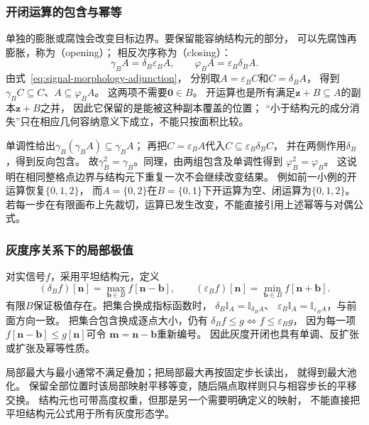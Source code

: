 \subsubsection{开闭运算的包含与幂等}
单独的膨胀或腐蚀会改变目标边界。要保留能容纳结构元的部分，
可以先腐蚀再膨胀，称为（opening）；
相反次序称为（closing）：
\begin{equation}
 \gamma_B A=\delta_B\varepsilon_B A,\qquad
 \varphi_B A=\varepsilon_B\delta_B A.
 \label{eq:signal-morphology-opening-closing}
\end{equation}
由式~\eqref{eq:signal-morphology-adjunction}，
分别取$A=\varepsilon_B C$和$C=\delta_B A$，
得到$\gamma_B C\subseteq C$、$A\subseteq\varphi_B A$。
这两项不需要$\bm0\in B$。
开运算也是所有满足$\bm z+B\subseteq A$的副本$\bm z+B$之并，
因此它保留的是能被这种副本覆盖的位置；
“小于结构元的成分消失”只在相应几何容纳意义下成立，不能只按面积比较。

单调性给出$\gamma_B(\gamma_B A)\subseteq\gamma_B A$；
再把$C=\varepsilon_B A$代入$C\subseteq\varepsilon_B\delta_B C$，
并在两侧作用$\delta_B$，得到反向包含。
故$\gamma_B^2=\gamma_B$。同理，由两组包含及单调性得到
$\varphi_B^2=\varphi_B$。
这说明在相同整格点边界与结构元下重复一次不会继续改变结果。
例如前一小例的开运算恢复$\{0,1,2\}$，
而$A=\{0,2\}$在$B=\{0,1\}$下开运算为空、闭运算为$\{0,1,2\}$。
若每一步在有限画布上先裁切，运算已发生改变，不能直接引用上述幂等与对偶公式。

\subsubsection{灰度序关系下的局部极值}
对实信号$f$，采用平坦结构元，定义
\begin{equation}
 (\delta_Bf)[\bm n]=\max_{\bm b\in B}f[\bm n-\bm b],\qquad
 (\varepsilon_Bf)[\bm n]=\min_{\bm b\in B}f[\bm n+\bm b].
 \label{eq:signal-grayscale-morphology}
\end{equation}
有限$B$保证极值存在。把集合换成指标函数时，
$\delta_B\mathbb I_A=\mathbb I_{\delta_B A}$、
$\varepsilon_B\mathbb I_A=\mathbb I_{\varepsilon_B A}$，与前面方向一致。
把集合包含换成逐点大小，仍有
$\delta_Bf\leq g\Longleftrightarrow f\leq\varepsilon_Bg$，
因为每一项$f[\bm n-\bm b]\leq g[\bm n]$可令
$\bm m=\bm n-\bm b$重新编号。
因此灰度开闭也具有单调、反扩张或扩张及幂等性质。

局部最大与最小通常不满足叠加；把局部最大再按固定步长读出，
就得到最大池化。
保留全部位置时该局部映射平移等变，随后隔点取样则只与相容步长的平移交换。
结构元也可带高度权重，但那是另一个需要明确定义的映射，
不能直接把平坦结构元公式用于所有灰度形态学。


